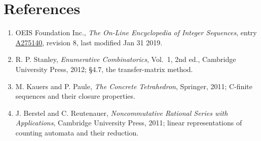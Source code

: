\documentclass[11pt]{article}
\theoremstyle{definition}
\begin{document}
\section{References}

\begin{enumerate}

\item OEIS Foundation Inc., \emph{The On-Line Encyclopedia of Integer Sequences}, entry \href{https://oeis.org/A275140}{A275140}, revision 8, last modified Jan 31 2019.

\item R. P. Stanley, \emph{Enumerative Combinatorics}, Vol.~1, 2nd ed., Cambridge University Press, 2012; \S4.7, the transfer-matrix method.

\item M. Kauers and P. Paule, \emph{The Concrete Tetrahedron}, Springer, 2011; C-finite sequences and their closure properties.

\item J. Berstel and C. Reutenauer, \emph{Noncommutative Rational Series with Applications}, Cambridge University Press, 2011; linear representations of counting automata and their reduction.

\end{enumerate}
\end{document}
